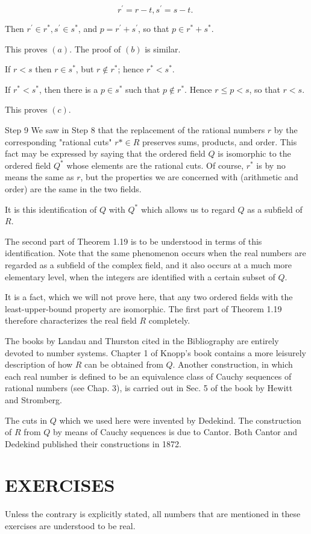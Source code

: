\documentclass[10pt]{article}
\begin{document}
$$
r^{\prime}=r-t, s^{\prime}=s-t \text {. }
$$

Then $r^{\prime} \in r^{*}, s^{\prime} \in s^{*}$, and $p=r^{\prime}+s^{\prime}$, so that $p \in r^{*}+s^{*}$.

This proves $(a)$. The proof of $(b)$ is similar.

If $r<s$ then $r \in s^{*}$, but $r \notin r^{*}$; hence $r^{*}<s^{*}$.

If $r^{*}<s^{*}$, then there is a $p \in s^{*}$ such that $p \notin r^{*}$. Hence $r \leq p<s$, so that $r<s$.

This proves $(c)$.

Step 9 We saw in Step 8 that the replacement of the rational numbers $r$ by the corresponding "rational cuts" $r * \in R$ preserves sums, products, and order. This fact may be expressed by saying that the ordered field $Q$ is isomorphic to the ordered field $Q^{*}$ whose elements are the rational cuts. Of course, $r^{*}$ is by no means the same as $r$, but the properties we are concerned with (arithmetic and order) are the same in the two fields.

It is this identification of $Q$ with $Q^{*}$ which allows us to regard $Q$ as a subfield of $R$.

The second part of Theorem 1.19 is to be understood in terms of this identification. Note that the same phenomenon occurs when the real numbers are regarded as a subfield of the complex field, and it also occurs at a much more elementary level, when the integers are identified with a certain subset of $Q$.

It is a fact, which we will not prove here, that any two ordered fields with the least-upper-bound property are isomorphic. The first part of Theorem 1.19 therefore characterizes the real field $R$ completely.

The books by Landau and Thurston cited in the Bibliography are entirely devoted to number systems. Chapter 1 of Knopp's book contains a more leisurely description of how $R$ can be obtained from $Q$. Another construction, in which each real number is defined to be an equivalence class of Cauchy sequences of rational numbers (see Chap. 3), is carried out in Sec. 5 of the book by Hewitt and Stromberg.

The cuts in $Q$ which we used here were invented by Dedekind. The construction of $R$ from $Q$ by means of Cauchy sequences is due to Cantor. Both Cantor and Dedekind published their constructions in 1872.

\section{EXERCISES}
Unless the contrary is explicitly stated, all numbers that are mentioned in these exercises are understood to be real.
\end{document}
